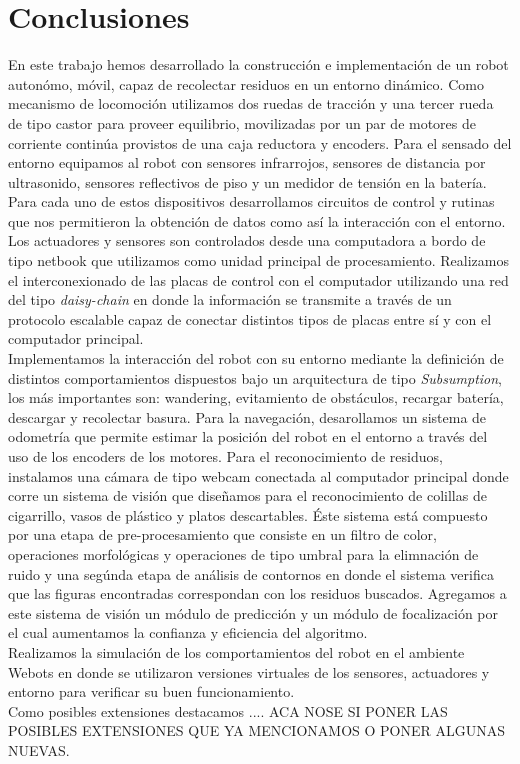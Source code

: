 
\section{Conclusiones}
En este trabajo hemos desarrollado la construcci\'on e implementaci\'on
de un robot auton\'omo, m\'ovil, capaz de recolectar residuos en un entorno din\'amico. 
Como mecanismo de locomoci\'on utilizamos dos ruedas de tracci\'on y una 
tercer rueda de tipo castor para proveer equilibrio, movilizadas por un 
par de motores de corriente contin\'ua provistos de una caja reductora y encoders. 
Para el sensado del entorno equipamos al robot con sensores 
infrarrojos, sensores de distancia por ultrasonido, sensores reflectivos 
de piso y un medidor de tensi\'on en la bater\'ia. Para cada uno de estos 
dispositivos desarrollamos circuitos de control y rutinas que nos permitieron 
la obtenci\'on de datos como as\'i la interacci\'on con el entorno. 
Los actuadores y sensores son controlados desde una computadora a bordo de tipo
netbook que utilizamos como unidad principal de procesamiento. 
Realizamos el interconexionado de las placas de control con el computador
utilizando una red del tipo \emph{daisy-chain} en donde la informaci\'on se transmite 
a trav\'es de un protocolo escalable capaz de conectar distintos tipos de 
placas entre s\'i y con el computador principal.\\
\indent  Implementamos la interacci\'on del 
robot con su entorno mediante la definici\'on de distintos comportamientos dispuestos 
bajo un arquitectura de tipo \emph{Subsumption}, los m\'as importantes son: 
wandering, evitamiento de obst\'aculos, recargar bater\'ia, descargar y recolectar basura.
Para la navegaci\'on, desarollamos
un sistema de odometr\'ia que permite estimar la posici\'on del robot en 
el entorno a trav\'es del uso de los encoders de los motores.
Para el reconocimiento de residuos, instalamos una c\'amara de tipo webcam 
conectada al computador principal donde corre un sistema de visi\'on que 
dise\~namos para el reconocimiento de colillas de cigarrillo, vasos de pl\'astico 
y platos descartables. \'Este sistema est\'a compuesto por una etapa de 
pre-procesamiento que consiste en un filtro de color, operaciones morfol\'ogicas 
y operaciones de tipo umbral para la elimnaci\'on de ruido y una seg\'unda 
etapa de an\'alisis de contornos en donde el sistema verifica que las figuras encontradas 
correspondan con los residuos buscados. Agregamos a este sistema de 
visi\'on un m\'odulo de predicci\'on y un m\'odulo de focalizaci\'on por 
el cual aumentamos la confianza y eficiencia del algoritmo. \\ 
\indent Realizamos la simulaci\'on de los comportamientos del robot en el 
ambiente Webots en donde se utilizaron versiones virtuales de los sensores, actuadores y entorno 
para verificar su buen funcionamiento. \\
\indent Como posibles extensiones destacamos .... 
ACA NOSE SI PONER LAS POSIBLES EXTENSIONES QUE YA MENCIONAMOS O PONER ALGUNAS NUEVAS.
\label{conc}

